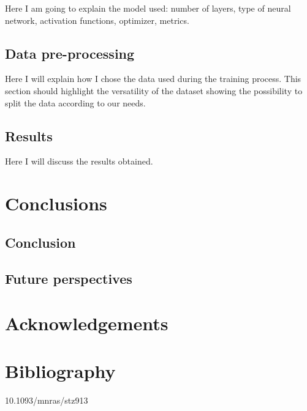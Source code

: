\documentclass[a4paper,10pt]{report}
\begin{document}
Here I am going to explain the model used: number of layers, type of neural network, activation functions,
optimizer, metrics.

\section{Data pre-processing}

Here I will explain how I chose the data used during the training process.
This section should highlight the versatility of the dataset showing the possibility to split the 
data according to our needs.

\section{Results}

Here I will discuss the results obtained.

\chapter{Conclusions}
\section{Conclusion}
\section{Future perspectives}

\chapter*{Acknowledgements}

\chapter*{Bibliography}

10.1093/mnras/stz913
\end{document}
